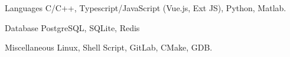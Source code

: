 

\begin{cvskills}

  \cvskill
    {Languages} %
    {C/C++, Typescript/JavaScript (Vue.js, Ext JS), Python, Matlab.} %

  \cvskill
    {Database} %
    {PostgreSQL, SQLite, Redis} %

  \cvskill
    {Miscellaneous} %
    {Linux, Shell Script, GitLab, CMake, GDB.} %

\end{cvskills}
